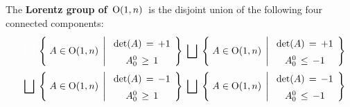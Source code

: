 
\vskip 0.5cm
\begin{corollary}
\mbox{}
\vskip 0.1cm
\noindent
The \textbf{Lorentz group of \,$\textnormal{O}(1,n)$}\, is the disjoint union of the following four connected components:
\begin{eqnarray*}
&&
{\color{white}\bigsqcup}\;
\left\{\;
	A \overset{{\color{white}.}}{\in} \textnormal{O}(1,n)
	\;\left\vert\;
		\begin{array}{ccc}
		\textnormal{det}(A) \,\overset{{\color{white}1}}{=}\, +1
		\\
		A^{0}_{0} \,\overset{{\color{white}1}}{\geq}\, 1
		\end{array}
		\right.
	\!\right\}
\;\bigsqcup\;
\left\{\;
	A \overset{{\color{white}.}}{\in} \textnormal{O}(1,n)
	\;\left\vert\;
		\begin{array}{ccc}
		\textnormal{det}(A) \,\overset{{\color{white}1}}{=}\, +1
		\\
		A^{0}_{0} \,\overset{{\color{white}1}}{\leq}\, -1
		\end{array}
		\right.
	\!\right\}
\\
&&
\bigsqcup\;
\left\{\;
	A \overset{{\color{white}.}}{\in} \textnormal{O}(1,n)
	\;\left\vert\;
		\begin{array}{ccc}
		\textnormal{det}(A) \,\overset{{\color{white}1}}{=}\, -1
		\\
		A^{0}_{0} \,\overset{{\color{white}1}}{\geq}\, 1
		\end{array}
		\right.
	\!\right\}
\;\bigsqcup\;
\left\{\;
	A \overset{{\color{white}.}}{\in} \textnormal{O}(1,n)
	\;\left\vert\;
		\begin{array}{ccc}
		\textnormal{det}(A) \,\overset{{\color{white}1}}{=}\, -1
		\\
		A^{0}_{0} \,\overset{{\color{white}1}}{\leq}\, -1
		\end{array}
		\right.
	\!\right\}
\end{eqnarray*}
\end{corollary}



